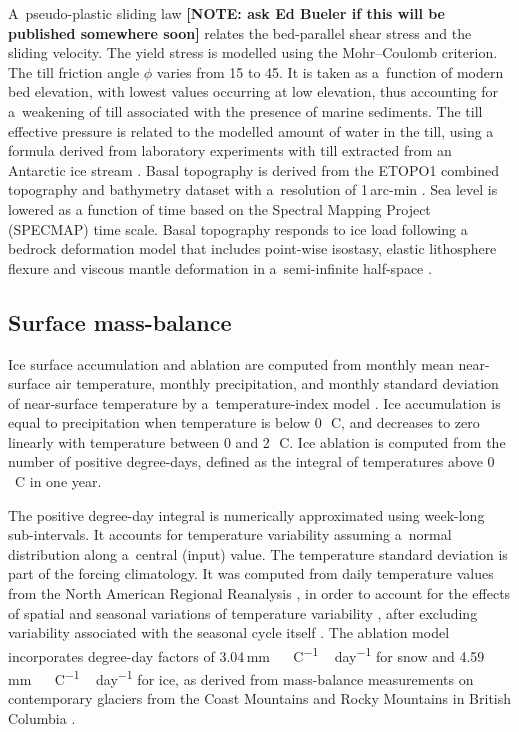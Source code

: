 \documentclass[tc, manuscript]{copernicus}
\newcommand{\note}[1]{\textbf{[NOTE: #1]}}
\begin{document}
A~pseudo-plastic sliding law \citep{PISM-authors.2014} \note{ask Ed Bueler if
this will be published somewhere soon} relates the
bed-parallel shear stress and the sliding velocity. The yield stress is
modelled using the Mohr--Coulomb criterion. The till friction angle $\phi$
varies from 15 to 45{\degree}. It is taken as a~function of modern bed
elevation, with lowest values occurring at low elevation, thus accounting
for a~weakening of till associated with the presence of marine sediments.
The till effective pressure is related to the modelled amount of water in the
till, using a formula derived from laboratory experiments with till extracted
from an Antarctic ice stream \citep[Eqn.~2]{Tulaczyk.etal.2000}. Basal
topography is
derived from the ETOPO1 combined topography and bathymetry dataset with
a~resolution of 1\,arc-min \citep{Amante.Eakins.2009}. Sea level is lowered as
a function of time based on the Spectral Mapping Project (SPECMAP)
\citep[SPECMAP,][]{Imbrie.etal.1989} time scale.
Basal topography responds to ice load
following a bedrock deformation model that includes point-wise isostasy,
elastic lithosphere flexure and viscous mantle deformation in a~semi-infinite
half-space \citep{Lingle.Clark.1985,Bueler.etal.2007}.

\subsection{Surface mass-balance}

Ice surface accumulation and ablation are computed from monthly mean
near-surface air temperature, monthly precipitation, and monthly standard
deviation of near-surface temperature by a~temperature-index model
\citep[e.g.,][]{Hock.2003}. Ice accumulation is equal to precipitation
when temperature is below 0\,\unit{{\degree}C}, and decreases to zero linearly
with temperature between 0 and 2\,\unit{{\degree}C}. Ice ablation is computed
from the number of positive degree-days, defined as the integral of
temperatures above 0\,\unit{{\degree}C} in one year.

The positive degree-day integral \citep[Eqn.~6]{Calov.Greve.2005} is
numerically
approximated using week-long sub-intervals. It accounts for temperature
variability assuming a~normal distribution along a~central (input) value. The
temperature standard deviation is part of the forcing climatology. It was
computed from daily temperature values from the North American Regional
Reanalysis \citep[NARR,][]{Mesinger.etal.2006}, in order to account for the
effects of spatial and seasonal variations of temperature variability
\citep[Fig.~\ref{fig:atm};][]{Seguinot.2013}, after excluding variability
associated with the seasonal cycle itself \citep[cf.][]
{Seguinot.Rogozhina.2014}. The ablation model incorporates degree-day factors
of 3.04\,\unit{mm\,{\degree}C^{-1}\,day^{-1}} for snow and
4.59\,\unit{mm\,{\degree}C^{-1}\,day^{-1}} for ice, as derived from
mass-balance measurements on contemporary glaciers from the Coast Mountains and
Rocky Mountains in British Columbia \citep{Shea.etal.2009}.
\end{document}
